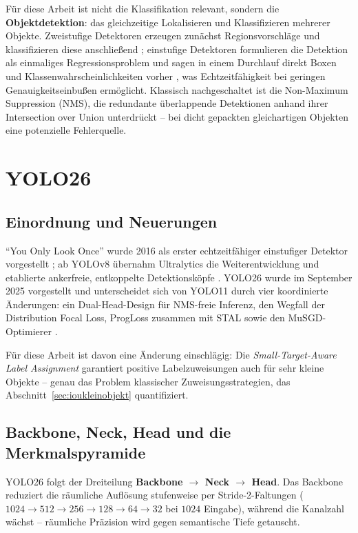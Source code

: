Für diese Arbeit ist nicht die Klassifikation relevant, sondern die
\textbf{Objektdetektion}: das gleichzeitige Lokalisieren und Klassifizieren
mehrerer Objekte. Zweistufige Detektoren erzeugen zunächst Regionsvorschläge und
klassifizieren diese anschließend \parencite{ren2015}; einstufige Detektoren
formulieren die Detektion als einmaliges Regressionsproblem und sagen in einem
Durchlauf direkt Boxen und Klassenwahrscheinlichkeiten vorher
\parencite{redmon2016,liu2016ssd}, was Echtzeitfähigkeit bei geringen
Genauigkeitseinbußen ermöglicht. Klassisch nachgeschaltet ist die
Non-Maximum Suppression (NMS), die redundante überlappende Detektionen anhand
ihrer Intersection over Union unterdrückt -- bei dicht gepackten gleichartigen
Objekten eine potenzielle Fehlerquelle.

\section{YOLO26}
\label{sec:yolo26}

\subsection{Einordnung und Neuerungen}

\enquote{You Only Look Once} wurde 2016 als erster echtzeitfähiger einstufiger
Detektor vorgestellt \parencite{redmon2016}; ab YOLOv8 übernahm Ultralytics die
Weiterentwicklung und etablierte ankerfreie, entkoppelte Detektionsköpfe
\parencite{sapkota2025}. YOLO26 wurde im September 2025 vorgestellt und
unterscheidet sich von YOLO11 durch vier koordinierte Änderungen: ein
Dual-Head-Design für NMS-freie Inferenz, den Wegfall der Distribution Focal Loss,
ProgLoss zusammen mit STAL sowie den MuSGD-Optimierer
\parencite{ultralytics2026,sapkota2025}.

Für diese Arbeit ist davon eine Änderung einschlägig: Die
\emph{Small-Target-Aware Label Assignment} garantiert positive Labelzuweisungen
auch für sehr kleine Objekte -- genau das Problem klassischer
Zuweisungsstrategien, das Abschnitt~\ref{sec:ioukleinobjekt} quantifiziert.

\subsection{Backbone, Neck, Head und die Merkmalspyramide}
\label{sec:neck}

YOLO26 folgt der Dreiteilung \textbf{Backbone $\to$ Neck $\to$ Head}. Das
Backbone reduziert die räumliche Auflösung stufenweise per Stride-2-Faltungen
($1024 \to 512 \to 256 \to 128 \to 64 \to 32$ bei $1024$\px{} Eingabe), während
die Kanalzahl wächst -- räumliche Präzision wird gegen semantische Tiefe
getauscht.

